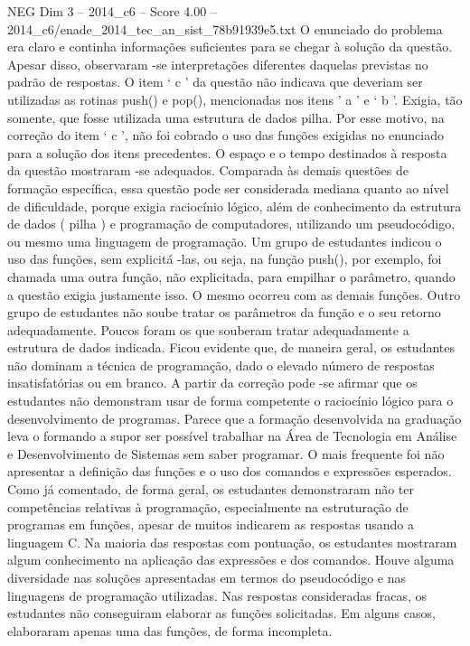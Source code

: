 \begin{textsample}{NEG Dim 3 – 2014\_c6 – Score 4.00 – 2014\_c6/enade\_2014\_tec\_an\_sist\_78b91939e5.txt}
O enunciado do problema era claro e continha informações suficientes para se chegar à solução da questão.
Apesar disso, observaram -se interpretações diferentes daquelas previstas no padrão de respostas.
O item ‘ c ’ da questão não indicava que deveriam ser utilizadas as rotinas push() e pop(), mencionadas nos itens ’ a ’ e ‘ b ’.
Exigia, tão somente, que fosse utilizada uma estrutura de dados pilha.
Por esse motivo, na correção do item ‘ c ’, não foi cobrado o uso das funções exigidas no enunciado para a solução dos itens precedentes.
O espaço e o tempo destinados à resposta da questão mostraram -se adequados.
Comparada às demais questões de formação específica, essa questão pode ser considerada mediana quanto ao nível de dificuldade, porque exigia raciocínio lógico, além de conhecimento da estrutura de dados ( pilha ) e programação de computadores, utilizando um pseudocódigo, ou mesmo uma linguagem de programação.
Um grupo de estudantes indicou o uso das funções, sem explicitá -las, ou seja, na função push(), por exemplo, foi chamada uma outra função, não explicitada, para empilhar o parâmetro, quando a questão exigia justamente isso.
O mesmo ocorreu com as demais funções.
Outro grupo de estudantes não soube tratar os parâmetros da função e o seu retorno adequadamente.
Poucos foram os que souberam tratar adequadamente a estrutura de dados indicada.
Ficou evidente que, de maneira geral, os estudantes não dominam a técnica de programação, dado o elevado número de respostas insatisfatórias ou em branco.
A partir da correção pode -se afirmar que os estudantes não demonstram usar de forma competente o raciocínio lógico para o desenvolvimento de programas.
Parece que a formação desenvolvida na graduação leva o formando a supor ser possível trabalhar na Área de Tecnologia em Análise e Desenvolvimento de Sistemas sem saber programar.
O mais frequente foi não apresentar a definição das funções e o uso dos comandos e expressões esperados.
Como já comentado, de forma geral, os estudantes demonstraram não ter competências relativas à programação, especialmente na estruturação de programas em funções, apesar de muitos indicarem as respostas usando a linguagem C.
Na maioria das respostas com pontuação, os estudantes mostraram algum conhecimento na aplicação das expressões e dos comandos.
Houve alguma diversidade nas soluções apresentadas em termos do pseudocódigo e nas linguagens de programação utilizadas.
Nas respostas consideradas fracas, os estudantes não conseguiram elaborar as funções solicitadas.
Em alguns casos, elaboraram apenas uma das funções, de forma incompleta.

\end{textsample}
